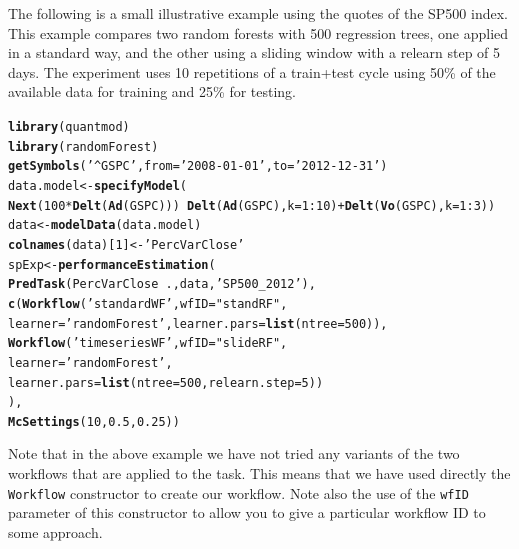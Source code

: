 \documentclass[10pt,a4paper]{article}\usepackage[]{graphicx}\usepackage[]{color}
\makeatletter
\newcommand{\hlnum}[1]{\textcolor[rgb]{0.686,0.059,0.569}{#1}}%
\newcommand{\hlstr}[1]{\textcolor[rgb]{0.192,0.494,0.8}{#1}}%
\newcommand{\hlopt}[1]{\textcolor[rgb]{0,0,0}{#1}}%
\newcommand{\hlstd}[1]{\textcolor[rgb]{0.345,0.345,0.345}{#1}}%
\newcommand{\hlkwb}[1]{\textcolor[rgb]{0.69,0.353,0.396}{#1}}%
\newcommand{\hlkwc}[1]{\textcolor[rgb]{0.333,0.667,0.333}{#1}}%
\newcommand{\hlkwd}[1]{\textcolor[rgb]{0.737,0.353,0.396}{\textbf{#1}}}%
\newenvironment{kframe}{%
 \def\at@end@of@kframe{}%
 \ifinner\ifhmode%
  \def\at@end@of@kframe{\end{minipage}}%
  \begin{minipage}{\columnwidth}%
 \fi\fi%
 \def\FrameCommand##1{\hskip\@totalleftmargin \hskip-\fboxsep
 \colorbox{shadecolor}{##1}\hskip-\fboxsep
     \hskip-\linewidth \hskip-\@totalleftmargin \hskip\columnwidth}%
 \MakeFramed {\advance\hsize-\width
   \@totalleftmargin\z@ \linewidth\hsize
   \@setminipage}}%
 {\par\unskip\endMakeFramed%
 \at@end@of@kframe}
\newenvironment{knitrout}{}{} %
\makeatother
\begin{document}
The following is a small illustrative example using the quotes of the
SP500 index. This example compares two random forests with 500
regression trees, one applied in a standard way, and the other using
a sliding window with a relearn step of 5 days. The experiment
uses 10 repetitions of a train+test cycle using 50\% of the available
data for training and 25\% for testing.

\begin{knitrout}\small
{}\color{fgcolor}\begin{kframe}
\begin{alltt}
\hlkwd{library}\hlstd{(quantmod)}
\hlkwd{library}\hlstd{(randomForest)}
\hlkwd{getSymbols}\hlstd{(}\hlstr{'^GSPC'}\hlstd{,}\hlkwc{from}\hlstd{=}\hlstr{'2008-01-01'}\hlstd{,}\hlkwc{to}\hlstd{=}\hlstr{'2012-12-31'}\hlstd{)}
\hlstd{data.model} \hlkwb{<-} \hlkwd{specifyModel}\hlstd{(}
  \hlkwd{Next}\hlstd{(}\hlnum{100}\hlopt{*}\hlkwd{Delt}\hlstd{(}\hlkwd{Ad}\hlstd{(GSPC)))} \hlopt{~} \hlkwd{Delt}\hlstd{(}\hlkwd{Ad}\hlstd{(GSPC),}\hlkwc{k}\hlstd{=}\hlnum{1}\hlopt{:}\hlnum{10}\hlstd{)}\hlopt{+}\hlkwd{Delt}\hlstd{(}\hlkwd{Vo}\hlstd{(GSPC),}\hlkwc{k}\hlstd{=}\hlnum{1}\hlopt{:}\hlnum{3}\hlstd{))}
\hlstd{data} \hlkwb{<-} \hlkwd{modelData}\hlstd{(data.model)}
\hlkwd{colnames}\hlstd{(data)[}\hlnum{1}\hlstd{]} \hlkwb{<-} \hlstr{'PercVarClose'}
\hlstd{spExp} \hlkwb{<-} \hlkwd{performanceEstimation}\hlstd{(}
  \hlkwd{PredTask}\hlstd{(PercVarClose} \hlopt{~} \hlstd{.,data,}\hlstr{'SP500_2012'}\hlstd{),}
  \hlkwd{c}\hlstd{(}\hlkwd{Workflow}\hlstd{(}\hlstr{'standardWF'}\hlstd{,}\hlkwc{wfID}\hlstd{=}\hlstr{"standRF"}\hlstd{,}
             \hlkwc{learner}\hlstd{=}\hlstr{'randomForest'}\hlstd{,}\hlkwc{learner.pars}\hlstd{=}\hlkwd{list}\hlstd{(}\hlkwc{ntree}\hlstd{=}\hlnum{500}\hlstd{)),}
    \hlkwd{Workflow}\hlstd{(}\hlstr{'timeseriesWF'}\hlstd{,}\hlkwc{wfID}\hlstd{=}\hlstr{"slideRF"}\hlstd{,}
             \hlkwc{learner}\hlstd{=}\hlstr{'randomForest'}\hlstd{,}
             \hlkwc{learner.pars}\hlstd{=}\hlkwd{list}\hlstd{(}\hlkwc{ntree}\hlstd{=}\hlnum{500}\hlstd{,}\hlkwc{relearn.step}\hlstd{=}\hlnum{5}\hlstd{))}
   \hlstd{),}
  \hlkwd{McSettings}\hlstd{(}\hlnum{10}\hlstd{,}\hlnum{0.5}\hlstd{,}\hlnum{0.25}\hlstd{))}
\end{alltt}
\end{kframe}
\end{knitrout}


Note that in the above example we have not tried any variants of the two workflows that are applied to the task. This means that we have used directly the \texttt{Workflow} constructor to create our workflow. Note also the use of the \texttt{wfID} parameter of this constructor to allow you to give a particular workflow ID to some approach.
\end{document}

